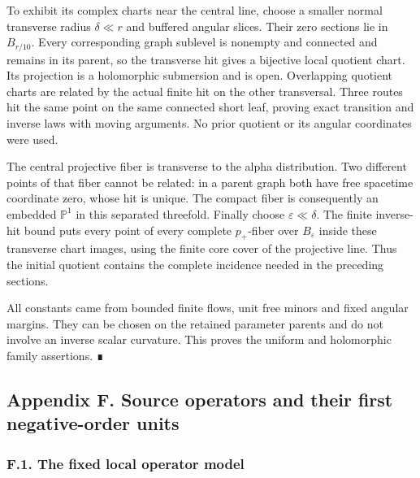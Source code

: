 \documentclass[
  english,
  11pt,
  reqno]{amsart}
\newcounter{none} %
\begin{document}
To exhibit its complex charts near the central line, choose a smaller
normal transverse radius \(\delta\ll r\) and buffered angular slices.
Their zero sections lie in \(B_{r/10}\). Every corresponding graph
sublevel is nonempty and connected and remains in its parent, so the
transverse hit gives a bijective local quotient chart. Its projection is
a holomorphic submersion and is open. Overlapping quotient charts are
related by the actual finite hit on the other transversal. Three routes
hit the same point on the same connected short leaf, proving exact
transition and inverse laws with moving arguments. No prior quotient or
its angular coordinates were used.

The central projective fiber is transverse to the alpha distribution.
Two different points of that fiber cannot be related: in a parent graph
both have free spacetime coordinate zero, whose hit is unique. The
compact fiber is consequently an embedded \(\mathbb P^1\) in this
separated threefold. Finally choose \(\varepsilon\ll\delta\). The finite
inverse-hit bound puts every point of every complete \(p_+\)-fiber over
\(B_\varepsilon\) inside these transverse chart images, using the finite
core cover of the projective line. Thus the initial quotient contains
the complete incidence needed in the preceding sections.

All constants came from bounded finite flows, unit free minors and fixed
angular margins. They can be chosen on the retained parameter parents
and do not involve an inverse scalar curvature. This proves the uniform
and holomorphic family assertions. ∎

\protect{}\label{app:gg-source-operators}

\subsection{Appendix F. Source operators and their first negative-order
units}\label{appendix-f.-source-operators-and-their-first-negative-order-units}

\protect{}\label{sec:gg-op-local-model}

\subsubsection{F.1. The fixed local operator
model}\label{f.1.-the-fixed-local-operator-model}
\end{document}
